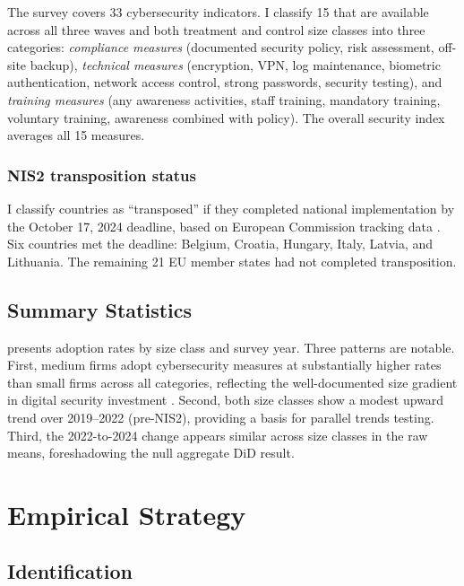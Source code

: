 \documentclass[12pt]{article}
\begin{document}
The survey covers 33 cybersecurity indicators. I classify 15 that are available across all three waves and both treatment and control size classes into three categories: \textit{compliance measures} (documented security policy, risk assessment, off-site backup), \textit{technical measures} (encryption, VPN, log maintenance, biometric authentication, network access control, strong passwords, security testing), and \textit{training measures} (any awareness activities, staff training, mandatory training, voluntary training, awareness combined with policy). The overall security index averages all 15 measures.

\subsubsection*{NIS2 transposition status} I classify countries as ``transposed'' if they completed national implementation by the October 17, 2024 deadline, based on European Commission tracking data \citep{ecNIS2tracker}. Six countries met the deadline: Belgium, Croatia, Hungary, Italy, Latvia, and Lithuania. The remaining 21 EU member states had not completed transposition.

\subsection{Summary Statistics}



 presents adoption rates by size class and survey year. Three patterns are notable. First, medium firms adopt cybersecurity measures at substantially higher rates than small firms across all categories, reflecting the well-documented size gradient in digital security investment \citep{enisa2023threat}. Second, both size classes show a modest upward trend over 2019--2022 (pre-NIS2), providing a basis for parallel trends testing. Third, the 2022-to-2024 change appears similar across size classes in the raw means, foreshadowing the null aggregate DiD result.

\section{Empirical Strategy}

\subsection{Identification}
\end{document}
